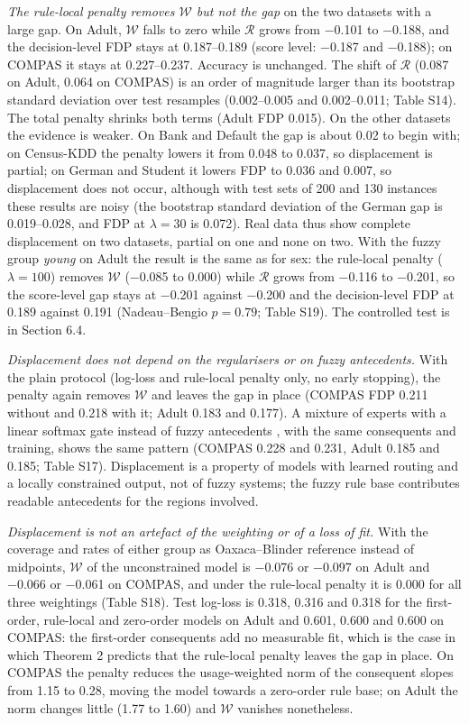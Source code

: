 \emph{The rule-local penalty removes \(\mathcal W\) but not the gap} on the two datasets with a large gap. On Adult, \(\mathcal W\) falls to zero while \(\mathcal R\) grows from −0.101 to −0.188, and the decision-level FDP stays at 0.187--0.189 (score level: −0.187 and −0.188); on COMPAS it stays at 0.227--0.237. Accuracy is unchanged. The shift of \(\mathcal R\) (0.087 on Adult, 0.064 on COMPAS) is an order of magnitude larger than its bootstrap standard deviation over test resamples (0.002--0.005 and 0.002--0.011; Table S14). The total penalty shrinks both terms (Adult FDP 0.015). On the other datasets the evidence is weaker. On Bank and Default the gap is about 0.02 to begin with; on Census-KDD the penalty lowers it from 0.048 to 0.037, so displacement is partial; on German and Student it lowers FDP to 0.036 and 0.007, so displacement does not occur, although with test sets of 200 and 130 instances these results are noisy (the bootstrap standard deviation of the German gap is 0.019--0.028, and FDP at \(\lambda = 30\) is 0.072). Real data thus show complete displacement on two datasets, partial on one and none on two. With the fuzzy group \emph{young} on Adult the result is the same as for sex: the rule-local penalty (\(\lambda = 100\)) removes \(\mathcal W\) (−0.085 to 0.000) while \(\mathcal R\) grows from −0.116 to −0.201, so the score-level gap stays at −0.201 against −0.200 and the decision-level FDP at 0.189 against 0.191 (Nadeau--Bengio \(p = 0.79\); Table S19). The controlled test is in Section 6.4.

\emph{Displacement does not depend on the regularisers or on fuzzy antecedents.} With the plain protocol (log-loss and rule-local penalty only, no early stopping), the penalty again removes \(\mathcal W\) and leaves the gap in place (COMPAS FDP 0.211 without and 0.218 with it; Adult 0.183 and 0.177). A mixture of experts with a linear softmax gate instead of fuzzy antecedents \cite{jacobs}, with the same consequents and training, shows the same pattern (COMPAS 0.228 and 0.231, Adult 0.185 and 0.185; Table S17). Displacement is a property of models with learned routing and a locally constrained output, not of fuzzy systems; the fuzzy rule base contributes readable antecedents for the regions involved.

\emph{Displacement is not an artefact of the weighting or of a loss of fit.} With the coverage and rates of either group as Oaxaca--Blinder reference instead of midpoints, \(\mathcal W\) of the unconstrained model is −0.076 or −0.097 on Adult and −0.066 or −0.061 on COMPAS, and under the rule-local penalty it is 0.000 for all three weightings (Table S18). Test log-loss is 0.318, 0.316 and 0.318 for the first-order, rule-local and zero-order models on Adult and 0.601, 0.600 and 0.600 on COMPAS: the first-order consequents add no measurable fit, which is the case in which Theorem 2 predicts that the rule-local penalty leaves the gap in place. On COMPAS the penalty reduces the usage-weighted norm of the consequent slopes from 1.15 to 0.28, moving the model towards a zero-order rule base; on Adult the norm changes little (1.77 to 1.60) and \(\mathcal W\) vanishes nonetheless.

